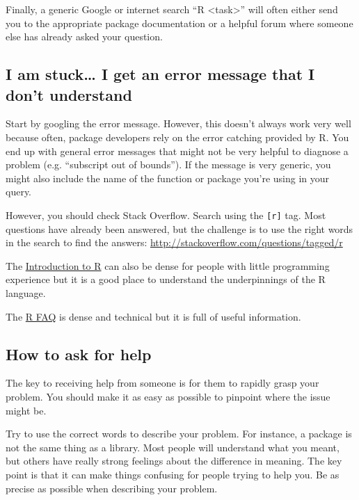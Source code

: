\documentclass[]{book}
\theoremstyle{definition}
\theoremstyle{definition}
\theoremstyle{remark}
\begin{document}
Finally, a generic Google or internet search ``R
\textless{}task\textgreater{}'' will often either send you to the
appropriate package documentation or a helpful forum where someone else
has already asked your question.

\subsection{I am stuck\ldots{} I get an error message that I don't
understand}\label{i-am-stuck-i-get-an-error-message-that-i-dont-understand}

Start by googling the error message. However, this doesn't always work
very well because often, package developers rely on the error catching
provided by R. You end up with general error messages that might not be
very helpful to diagnose a problem (e.g. ``subscript out of bounds'').
If the message is very generic, you might also include the name of the
function or package you're using in your query.

However, you should check Stack Overflow. Search using the
\texttt{{[}r{]}} tag. Most questions have already been answered, but the
challenge is to use the right words in the search to find the answers:
\url{http://stackoverflow.com/questions/tagged/r}

The
\href{http://cran.r-project.org/doc/manuals/R-intro.pdf}{Introduction to
R} can also be dense for people with little programming experience but
it is a good place to understand the underpinnings of the R language.

The \href{http://cran.r-project.org/doc/FAQ/R-FAQ.html}{R FAQ} is dense
and technical but it is full of useful information.

\subsection{How to ask for help}\label{how-to-ask-for-help}

The key to receiving help from someone is for them to rapidly grasp your
problem. You should make it as easy as possible to pinpoint where the
issue might be.

Try to use the correct words to describe your problem. For instance, a
package is not the same thing as a library. Most people will understand
what you meant, but others have really strong feelings about the
difference in meaning. The key point is that it can make things
confusing for people trying to help you. Be as precise as possible when
describing your problem.
\end{document}
